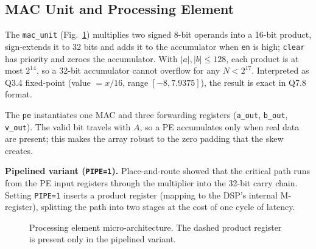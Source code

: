 \documentclass[conference]{IEEEtran}
\begin{document}
\subsection{MAC Unit and Processing Element}
The \texttt{mac\_unit} (Fig.~\ref{fig:pe}) multiplies two signed 8-bit
operands into a 16-bit product, sign-extends it to 32 bits and adds it to the
accumulator when \texttt{en} is high; \texttt{clear} has priority and zeroes
the accumulator. With $|a|,|b|\le128$, each product is at most $2^{14}$, so a
32-bit accumulator cannot overflow for any $N<2^{17}$. Interpreted as Q3.4
fixed-point (value $=x/16$, range $[-8, 7.9375]$), the result is exact in Q7.8
format.

The \texttt{pe} instantiates one MAC and three forwarding registers
(\texttt{a\_out}, \texttt{b\_out}, \texttt{v\_out}). The valid bit travels with
$A$, so a PE accumulates only when real data are present; this makes the
array robust to the zero padding that the skew creates.

\textbf{Pipelined variant (\texttt{PIPE=1}).} Place-and-route showed that the
critical path runs from the PE input registers through the multiplier into
the 32-bit carry chain. Setting \texttt{PIPE=1} inserts a product register
(mapping to the DSP's internal M-register), splitting the path into two
stages at the cost of one cycle of latency.

\begin{figure}[t]
\centering
{}
\caption{Processing element micro-architecture. The dashed product register is present only in the pipelined variant.}
\label{fig:pe}
\end{figure}
\end{document}
